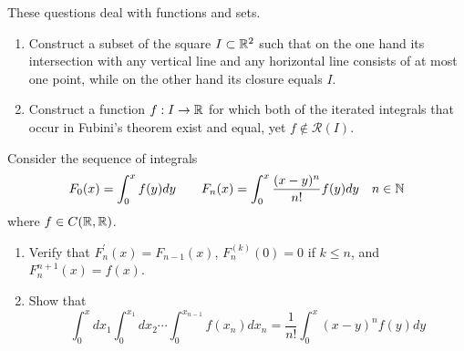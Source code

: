 \documentclass{article}
\newenvironment{problem}[2][Problem]{\begin{trivlist}
\item[\hskip \labelsep {\bfseries #1}\hskip \labelsep {\bfseries #2.}]}{\end{trivlist}}
\begin{document}
\begin{problem}{4}
	These questions deal with functions and sets.
	\begin{enumerate}
		\item Construct a subset of the square $ I \subset \mathbb{R}^2 $ such that on the one hand its intersection with any vertical line and any horizontal line consists of at most one point, while on the other hand its closure equals $ I $.
		\item Construct a function $ f:I \to \mathbb{R} $ for which both of the iterated integrals that occur in Fubini's theorem exist and equal, yet $ f \notin \mathcal{R}(I) $.
	\end{enumerate}
\end{problem}
\begin{problem}{5}
	Consider the sequence of integrals
	\begin{equation}
		F_0(x)=\int_{0}^{x}f(y)dy\qquad F_n(x)=\int_{0}^{x}\frac{(x-y)^n}{n!}f(y)dy \quad n\in \mathbb{N} \nonumber
	\end{equation}
	where $ f \in C(\mathbb{R},\mathbb{R}) $.
	\begin{enumerate}
		\item Verify that $ F_n^\prime(x)=F_{n-1}(x) $, $ F_n^{(k)}(0)=0 $ if $ k \leqslant n $, and $ F_n^{n+1}(x)=f(x) $.
		\item Show that
		\begin{equation}
			\int_{0}^{x}dx_1 \int_{0}^{x_1}dx_2 \cdots \int_{0}^{x_{n-1}}f(x_n)dx_n = \frac{1}{n!}\int_{0}^{x}(x-y)^n f(y)dy \nonumber
		\end{equation}
	\end{enumerate}
\end{problem}
\end{document}
